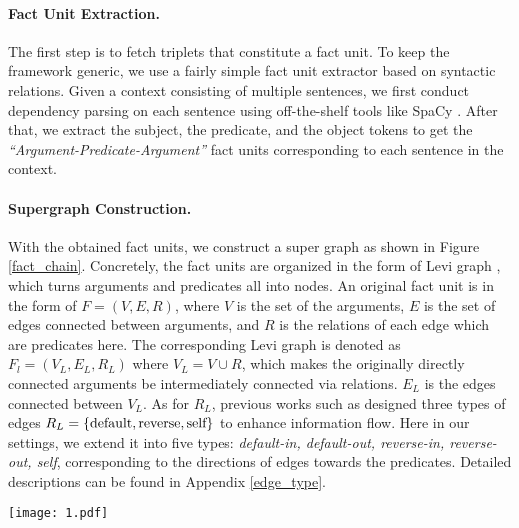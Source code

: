 \documentclass[11pt]{article}
\begin{document}
\paragraph{Fact Unit Extraction.} The first step is to fetch triplets that constitute a fact unit. To keep the framework generic, we use a fairly simple fact unit extractor based on syntactic relations. Given a context consisting of multiple sentences, we first conduct dependency parsing on each sentence using off-the-shelf tools like SpaCy \citep{spacy2}. After that, we extract the subject, the predicate, and the object tokens to get the \textit{``Argument-Predicate-Argument''} fact units corresponding to each sentence in the context.







\paragraph{Supergraph Construction.}
With the obtained fact units, 
we construct a super graph as shown in Figure \ref{fact_chain}.
Concretely, the fact units are organized in the form of Levi graph \citep{levi-1942}, which turns arguments and predicates all into nodes. An original fact unit is in the form of $F=(V,E,R)$, where $V$ is the set of the arguments, $E$ is the set of edges connected between arguments, and $R$ is the relations of each edge which are predicates here. The corresponding Levi graph is denoted as $F_l = (V_L, E_L, R_L)$ where $V_L=V \cup R$, which makes the originally directly connected arguments be intermediately connected via relations. $E_L$ is the edges connected between $V_L$. As for $R_L$, previous works such as \citep{marcheggiani-titov-2017-encoding, beck-etal-2018-graph} designed three types of edges $R_L=\{\textup{default}, \textup{reverse}, \textup{self}\}$ to enhance information flow. Here in our settings, we extend it into five types: \textit{default-in, default-out, reverse-in, reverse-out, self}, corresponding to the directions of edges towards the predicates. Detailed descriptions can be found in Appendix \ref{edge_type}.



\begin{figure*}
\vspace{-3 mm}
\centering
\texttt{[image: 1.pdf]}
\caption{The process of constructing the fact chain and its corresponding Levi graph form of an example in Figure \ref{example_logic}. Entities and relations are illustrated in their corresponding color.}
\label{fact_chain}
\vspace{-3 mm}
\end{figure*}
\end{document}
